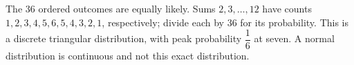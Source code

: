 The $36$ ordered outcomes are equally likely. Sums $2,3,\ldots,12$ have counts $1,2,3,4,5,6,5,4,3,2,1$, respectively; divide each by $36$ for its probability. This is a discrete triangular distribution, with peak probability $\dfrac{1}{6}$ at seven. A normal distribution is continuous and not this exact distribution.
